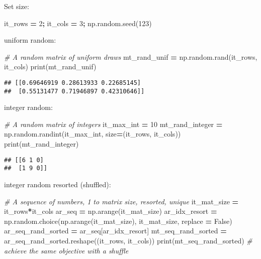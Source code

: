 \documentclass[
]{book}
\newenvironment{Shaded}{\begin{snugshade}}{\end{snugshade}}
\newcommand{\BuiltInTok}[1]{#1}
\newcommand{\CommentTok}[1]{\textcolor[rgb]{0.56,0.35,0.01}{\textit{#1}}}
\newcommand{\DecValTok}[1]{\textcolor[rgb]{0.00,0.00,0.81}{#1}}
\newcommand{\NormalTok}[1]{#1}
\newcommand{\OperatorTok}[1]{\textcolor[rgb]{0.81,0.36,0.00}{\textbf{#1}}}
\newcommand{\VariableTok}[1]{\textcolor[rgb]{0.00,0.00,0.00}{#1}}
\begin{document}
Set size:

\begin{Shaded}
\begin{Highlighting}[]
\NormalTok{it_rows }\OperatorTok{=} \DecValTok{2}\OperatorTok{;}
\NormalTok{it_cols }\OperatorTok{=} \DecValTok{3}\OperatorTok{;}
\NormalTok{np.random.seed(}\DecValTok{123}\NormalTok{)}
\end{Highlighting}
\end{Shaded}

uniform random:

\begin{Shaded}
\begin{Highlighting}[]
\CommentTok{# A random matrix of uniform draws}
\NormalTok{mt_rand_unif }\OperatorTok{=}\NormalTok{ np.random.rand(it_rows, it_cols)}
\BuiltInTok{print}\NormalTok{(mt_rand_unif)}
\end{Highlighting}
\end{Shaded}

\begin{verbatim}
## [[0.69646919 0.28613933 0.22685145]
##  [0.55131477 0.71946897 0.42310646]]
\end{verbatim}

integer random:

\begin{Shaded}
\begin{Highlighting}[]
\CommentTok{# A random matrix of integers}
\NormalTok{it_max_int }\OperatorTok{=} \DecValTok{10}
\NormalTok{mt_rand_integer }\OperatorTok{=}\NormalTok{ np.random.randint(it_max_int, size}\OperatorTok{=}\NormalTok{(it_rows, it_cols))}
\BuiltInTok{print}\NormalTok{(mt_rand_integer)}
\end{Highlighting}
\end{Shaded}

\begin{verbatim}
## [[6 1 0]
##  [1 9 0]]
\end{verbatim}

integer random resorted (shuffled):

\begin{Shaded}
\begin{Highlighting}[]
\CommentTok{# A sequence of numbers, 1 to matrix size, resorted, unique}
\NormalTok{it_mat_size }\OperatorTok{=}\NormalTok{ it_rows}\OperatorTok{*}\NormalTok{it_cols}
\NormalTok{ar_seq }\OperatorTok{=}\NormalTok{ np.arange(it_mat_size)}
\NormalTok{ar_idx_resort }\OperatorTok{=}\NormalTok{ np.random.choice(np.arange(it_mat_size), it_mat_size, replace }\OperatorTok{=} \VariableTok{False}\NormalTok{)}
\NormalTok{ar_seq_rand_sorted }\OperatorTok{=}\NormalTok{ ar_seq[ar_idx_resort]}
\NormalTok{mt_seq_rand_sorted }\OperatorTok{=}\NormalTok{ ar_seq_rand_sorted.reshape((it_rows, it_cols))}
\BuiltInTok{print}\NormalTok{(mt_seq_rand_sorted)}
\CommentTok{# achieve the same objective with a shuffle}
\end{Highlighting}
\end{Shaded}
\end{document}
